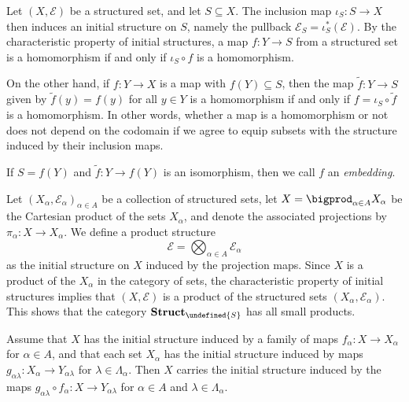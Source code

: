 \documentclass[article, a4paper, 11pt, oneside]{memoir}
\let\mathfrak\undefined
\numberwithin{equation}{chapter}
\newcommand{\calE}{\mathcal{E}}
\newcommand{\strucS}{\mathfrak{S}}
\newcommand{\ncat}[1]{\mathbf{#1}} %
\newcommand{\catStruc}[1]{\ncat{Struct}_{#1}} %
\newcommand{\catStrucS}{\catStruc{\strucS}} %
\begin{document}
\begin{examplebreak}[Subsets]
    Let $(X,\calE)$ be a structured set, and let $S \subseteq X$. The inclusion map $\iota_S \colon S \to X$ then induces an initial structure on $S$, namely the pullback $\calE_S = \iota_S^*(\calE)$. By the characteristic property of initial structures, a map $f \colon Y \to S$ from a structured set is a homomorphism if and only if $\iota_S \circ f$ is a homomorphism.

    On the other hand, if $f \colon Y \to X$ is a map with $f(Y) \subseteq S$, then the map $\tilde f \colon Y \to S$ given by $\tilde f(y) = f(y)$ for all $y \in Y$ is a homomorphism if and only if $f = \iota_S \circ \tilde f$ is a homomorphism. In other words, whether a map is a homomorphism or not does not depend on the codomain if we agree to equip subsets with the structure induced by their inclusion maps.

    If $S = f(Y)$ and $\tilde f \colon Y \to f(Y)$ is an isomorphism, then we call $f$ an \emph{embedding}.
\end{examplebreak}

\begin{examplebreak}[Products]
    Let $(X_\alpha, \calE_\alpha)_{\alpha \in A}$ be a collection of structured sets, let $X = \bigprod_{\alpha \in A} X_\alpha$ be the Cartesian product of the sets $X_\alpha$, and denote the associated projections by $\pi_\alpha \colon X \to X_\alpha$. We define a product structure
    \begin{equation*}
        \calE = \bigotimes_{\alpha \in A} \calE_\alpha
    \end{equation*}
    as the initial structure on $X$ induced by the projection maps. Since $X$ is a product of the $X_\alpha$ in the category of sets, the characteristic property of initial structures implies that $(X,\calE)$ is a product of the structured sets $(X_\alpha,\calE_\alpha)$. This shows that the category $\catStrucS$ has all small products.
\end{examplebreak}


\begin{proposition}
    Assume that $X$ has the initial structure induced by a family of maps $f_\alpha \colon X \to X_\alpha$ for $\alpha \in A$, and that each set $X_\alpha$ has the initial structure induced by maps $g_{\alpha\lambda} \colon X_\alpha \to Y_{\alpha\lambda}$ for $\lambda \in \Lambda_\alpha$. Then $X$ carries the initial structure induced by the maps $g_{\alpha\lambda} \circ f_\alpha \colon X \to Y_{\alpha\lambda}$ for $\alpha \in A$ and $\lambda \in \Lambda_\alpha$.
\end{proposition}
\end{document}
